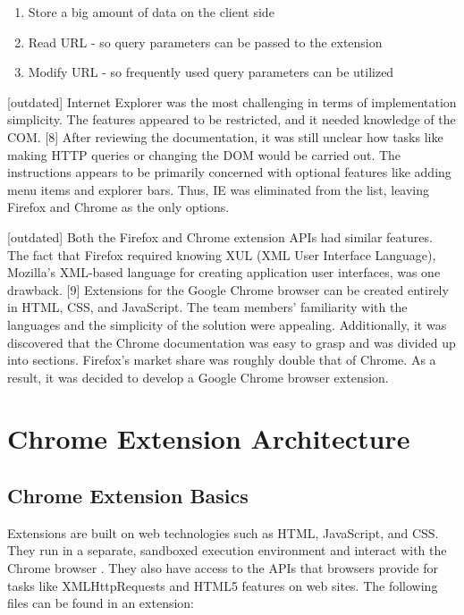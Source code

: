 \begin{enumerate}
  \item Store a big amount of data on the client side
  \item Read URL - so query parameters can be passed to the extension
  \item Modify URL - so frequently used query parameters can be utilized
\end{enumerate}

[outdated] Internet Explorer was the most challenging in terms of implementation simplicity. The features appeared to be restricted, and it needed knowledge of the COM. [8] After reviewing the documentation, it was still unclear how tasks like making HTTP queries or changing the DOM would be carried out. The instructions appears to be primarily concerned with optional features like adding menu items and explorer bars. Thus, IE was eliminated from the list, leaving Firefox and Chrome as the only options.

  [outdated] Both the Firefox and Chrome extension APIs had similar features. The fact that Firefox required knowing XUL (XML User Interface Language), Mozilla's XML-based language for creating application user interfaces, was one drawback. [9] Extensions for the Google Chrome browser can be created entirely in HTML, CSS, and JavaScript. The team members' familiarity with the languages and the simplicity of the solution were appealing. Additionally, it was discovered that the Chrome documentation was easy to grasp and was divided up into sections. Firefox's market share was roughly double that of Chrome. As a result, it was decided to develop a Google Chrome browser extension.


\section{Chrome Extension Architecture}

\subsection{Chrome Extension Basics}
Extensions are built on web technologies such as HTML, JavaScript, and CSS. They run in a separate, sandboxed execution environment and interact with the Chrome browser \autocite{google2021what}. They also have access to the APIs that browsers provide for tasks like XMLHttpRequests and HTML5 features on web sites. The following files can be found in an extension:

